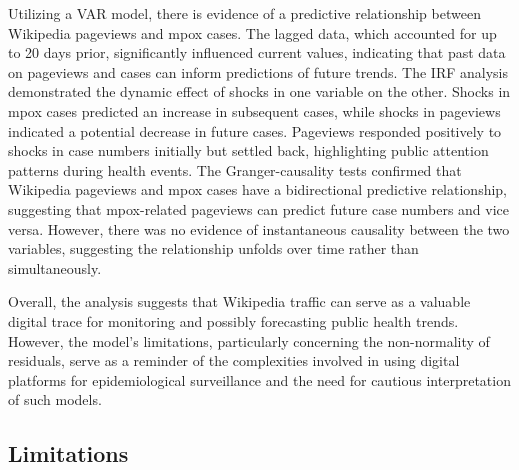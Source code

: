 \documentclass[
  12pt,
]{article}
\begin{document}
Utilizing a VAR model, there is evidence of a predictive relationship
between Wikipedia pageviews and mpox cases. The lagged data, which
accounted for up to 20 days prior, significantly influenced current
values, indicating that past data on pageviews and cases can inform
predictions of future trends. The IRF analysis demonstrated the dynamic
effect of shocks in one variable on the other. Shocks in mpox cases
predicted an increase in subsequent cases, while shocks in pageviews
indicated a potential decrease in future cases. Pageviews responded
positively to shocks in case numbers initially but settled back,
highlighting public attention patterns during health events. The
Granger-causality tests confirmed that Wikipedia pageviews and mpox
cases have a bidirectional predictive relationship, suggesting that
mpox-related pageviews can predict future case numbers and vice versa.
However, there was no evidence of instantaneous causality between the
two variables, suggesting the relationship unfolds over time rather than
simultaneously.

Overall, the analysis suggests that Wikipedia traffic can serve as a
valuable digital trace for monitoring and possibly forecasting public
health trends. However, the model's limitations, particularly concerning
the non-normality of residuals, serve as a reminder of the complexities
involved in using digital platforms for epidemiological surveillance and
the need for cautious interpretation of such models.

\subsection{Limitations}\label{limitations}
\end{document}
